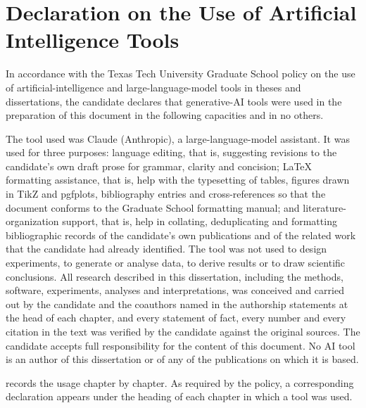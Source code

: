 \chapter{Declaration on the Use of Artificial Intelligence Tools}\label{app:ai}

In accordance with the Texas Tech University Graduate School policy on the use of artificial-intelligence and large-language-model tools in theses and dissertations, the candidate declares that generative-AI tools were used in the preparation of this document in the following capacities and in no others.

The tool used was Claude (Anthropic), a large-language-model assistant. It was used for three purposes: language editing, that is, suggesting revisions to the candidate's own draft prose for grammar, clarity and concision; \LaTeX{} formatting assistance, that is, help with the typesetting of tables, figures drawn in TikZ and pgfplots, bibliography entries and cross-references so that the document conforms to the Graduate School formatting manual; and literature-organization support, that is, help in collating, deduplicating and formatting bibliographic records of the candidate's own publications and of the related work that the candidate had already identified. The tool was not used to design experiments, to generate or analyse data, to derive results or to draw scientific conclusions. All research described in this dissertation, including the methods, software, experiments, analyses and interpretations, was conceived and carried out by the candidate and the coauthors named in the authorship statements at the head of each chapter, and every statement of fact, every number and every citation in the text was verified by the candidate against the original sources. The candidate accepts full responsibility for the content of this document. No AI tool is an author of this dissertation or of any of the publications on which it is based.

 records the usage chapter by chapter. As required by the policy, a corresponding declaration appears under the heading of each chapter in which a tool was used.

